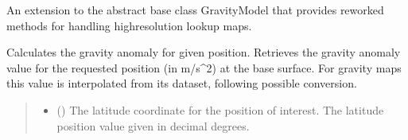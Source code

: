 \documentclass[letterpaper,10pt,english]{sphinxmanual}
\begin{document}
\begin{fulllineitems}
\label{\detokenize{modules/gravity/map:qnav.gravity.map.GravityMap}}
\pysigstartsignatures
{}
\pysigstopsignatures
\sphinxAtStartPar
An extension to the abstract base class GravityModel that provides
re\sphinxhyphen{}worked methods for handling high\sphinxhyphen{}resolution lookup maps.

\begin{fulllineitems}
\label{\detokenize{modules/gravity/map:qnav.gravity.map.GravityMap.get_anomaly}}
\pysigstartsignatures
{}
\pysigstopsignatures
\sphinxAtStartPar
Calculates the gravity anomaly for given position.
Retrieves the gravity anomaly value for the requested position
(in m/s\textasciicircum{}2) at the base surface. For gravity maps this value is
interpolated from its dataset, following possible conversion.
\begin{quote}\begin{description}
\begin{itemize}
\item {} 
\sphinxAtStartPar
{} () \textendash{} The latitude coordinate for the position of interest.
The latitude position value given in decimal degrees.


\end{itemize}
\end{description}
\end{quote}
\end{fulllineitems}
\end{fulllineitems}
\end{document}
